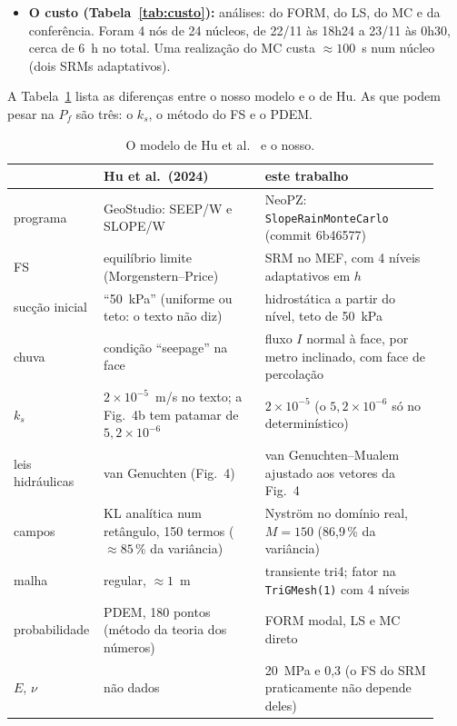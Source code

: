 \documentclass[11pt,a4paper]{article}
\begin{document}
\begin{itemize}
\begin{itemize}
        \anPorLinha{} análises em média.
      \item \emph{Monte Carlo direto:} de 300 a 4000 realizações por cenário, pareadas (a realização $n$ usa os mesmos
        números em todos os cenários), com o IC de Wilson~\cite{wilson1927}.
      \item \emph{Conferência mc13:} as 20 primeiras realizações de cada cenário, com o FS de 6 em 6~h de 0 a 72~h
        (13 instantes), para conferir que o menor FS cai no fim da chuva.
    \end{itemize}
  \item \textbf{O custo (Tabela~\ref{tab:custo}):} \nTot{} análises: \nFORMtot{} do FORM, \nLStot{} do LS,
    \nMCtot{} do MC e \nTreze{} da conferência. Foram 4 nós de 24 núcleos, de 22/11 às 18h24 a 23/11 às 0h30, cerca de
    6~h no total. Uma realização do MC custa $\approx 100$~s num núcleo (dois SRMs adaptativos).
\end{itemize}



A Tabela~\ref{tab:modelo} lista as diferenças entre o nosso modelo e o de Hu. As que podem pesar na $P_f$ são três: o
$k_s$, o método do FS e o PDEM.

\begin{table}[htbp]\centering\footnotesize\setlength{\tabcolsep}{3pt}
\caption{O modelo de Hu et al.~\cite{hu2024} e o nosso.}\label{tab:modelo}
\begin{tabular}{p{0.16\linewidth}p{0.37\linewidth}p{0.40\linewidth}}\toprule
& Hu et al.\ (2024) & este trabalho \\\midrule
programa & GeoStudio: SEEP/W e SLOPE/W & NeoPZ: \texttt{SlopeRainMonteCarlo} (commit 6b46577) \\
FS & equilíbrio limite (Morgenstern--Price) & SRM no MEF, com 4 níveis adaptativos em $h$ \\
sucção inicial & ``50~kPa'' (uniforme ou teto: o texto não diz) & hidrostática a partir do nível, teto de 50~kPa \\
chuva & condição ``seepage'' na face & fluxo $I$ normal à face, por metro inclinado, com face de percolação \\
$k_s$ & $2 \times 10^{-5}$~m/s no texto; a Fig.~4b tem patamar de $5{,}2 \times 10^{-6}$ & $2 \times 10^{-5}$ (o
  $5{,}2 \times 10^{-6}$ só no determinístico) \\
leis hidráulicas & van Genuchten (Fig.~4) & van Genuchten--Mualem ajustado aos vetores da Fig.~4 \\
campos & KL analítica num retângulo, 150 termos ($\approx 85\,\%$ da variância) & Nyström no domínio real,
  $M = 150$ (86,9\,\% da variância) \\
malha & regular, $\approx 1$~m & transiente tri4; fator na \texttt{TriGMesh(1)} com 4 níveis \\
probabilidade & PDEM, 180 pontos (método da teoria dos números) & FORM modal, LS e MC direto \\
$E$, $\nu$ & não dados & 20~MPa e 0,3 (o FS do SRM praticamente não depende deles) \\
\bottomrule\end{tabular}\end{table}
\end{document}
